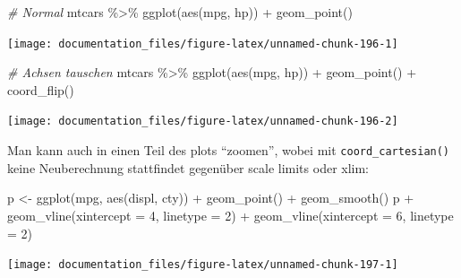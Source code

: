 \documentclass[
]{article}
\newenvironment{Shaded}{\begin{snugshade}}{\end{snugshade}}
\newcommand{\AttributeTok}[1]{\textcolor[rgb]{0.77,0.63,0.00}{#1}}
\newcommand{\CommentTok}[1]{\textcolor[rgb]{0.56,0.35,0.01}{\textit{#1}}}
\newcommand{\DecValTok}[1]{\textcolor[rgb]{0.00,0.00,0.81}{#1}}
\newcommand{\FunctionTok}[1]{\textcolor[rgb]{0.00,0.00,0.00}{#1}}
\newcommand{\NormalTok}[1]{#1}
\newcommand{\OtherTok}[1]{\textcolor[rgb]{0.56,0.35,0.01}{#1}}
\newcommand{\SpecialCharTok}[1]{\textcolor[rgb]{0.00,0.00,0.00}{#1}}
\begin{document}
\begin{Shaded}
\begin{Highlighting}[]
\CommentTok{\# Normal}
\NormalTok{mtcars }\SpecialCharTok{\%\textgreater{}\%}
  \FunctionTok{ggplot}\NormalTok{(}\FunctionTok{aes}\NormalTok{(mpg, hp)) }\SpecialCharTok{+}
  \FunctionTok{geom\_point}\NormalTok{()}
\end{Highlighting}
\end{Shaded}

\begin{center}\texttt{[image: documentation\_files/figure-latex/unnamed-chunk-196-1]} \end{center}

\begin{Shaded}
\begin{Highlighting}[]
\CommentTok{\# Achsen tauschen}
\NormalTok{mtcars }\SpecialCharTok{\%\textgreater{}\%}
  \FunctionTok{ggplot}\NormalTok{(}\FunctionTok{aes}\NormalTok{(mpg, hp)) }\SpecialCharTok{+}
  \FunctionTok{geom\_point}\NormalTok{() }\SpecialCharTok{+}
  \FunctionTok{coord\_flip}\NormalTok{()}
\end{Highlighting}
\end{Shaded}

\begin{center}\texttt{[image: documentation\_files/figure-latex/unnamed-chunk-196-2]} \end{center}

Man kann auch in einen Teil des plots ``zoomen'', wobei mit \texttt{coord\_cartesian()} keine Neuberechnung stattfindet gegenüber scale limits oder xlim:

\begin{Shaded}
\begin{Highlighting}[]
\NormalTok{p }\OtherTok{\textless{}{-}} \FunctionTok{ggplot}\NormalTok{(mpg, }\FunctionTok{aes}\NormalTok{(displ, cty)) }\SpecialCharTok{+} \FunctionTok{geom\_point}\NormalTok{() }\SpecialCharTok{+} \FunctionTok{geom\_smooth}\NormalTok{()}
\NormalTok{p }\SpecialCharTok{+} \FunctionTok{geom\_vline}\NormalTok{(}\AttributeTok{xintercept =} \DecValTok{4}\NormalTok{, }\AttributeTok{linetype =} \DecValTok{2}\NormalTok{) }\SpecialCharTok{+} \FunctionTok{geom\_vline}\NormalTok{(}\AttributeTok{xintercept =} \DecValTok{6}\NormalTok{, }\AttributeTok{linetype =} \DecValTok{2}\NormalTok{)}
\end{Highlighting}
\end{Shaded}

\begin{center}\texttt{[image: documentation\_files/figure-latex/unnamed-chunk-197-1]} \end{center}
\end{document}
